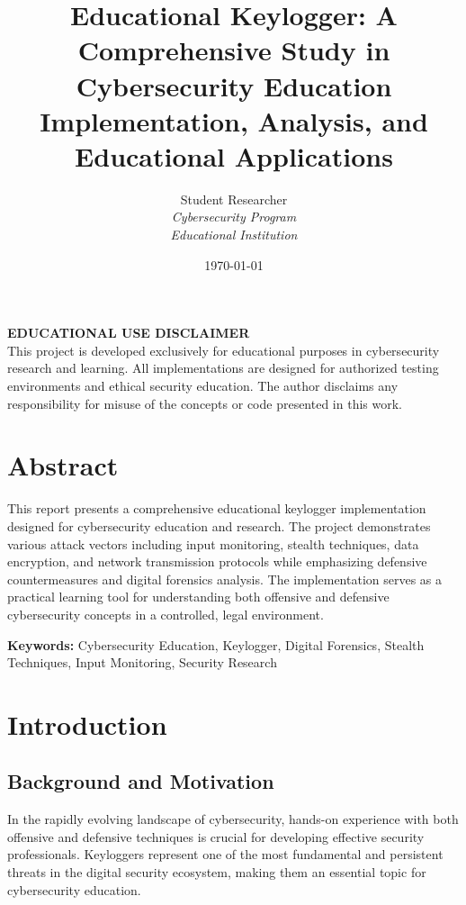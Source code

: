 \documentclass[12pt,a4paper]{article}
\title{\textbf{Educational Keylogger: A Comprehensive Study in Cybersecurity Education}\\
\large{Implementation, Analysis, and Educational Applications}}
\author{Student Researcher\\
\textit{Cybersecurity Program}\\
\textit{Educational Institution}}
\date{\today}
\begin{document}
\maketitle
\thispagestyle{empty}

\vfill
\begin{center}
\textbf{EDUCATIONAL USE DISCLAIMER}\\
\vspace{0.5cm}
This project is developed exclusively for educational purposes in cybersecurity research and learning. All implementations are designed for authorized testing environments and ethical security education. The author disclaims any responsibility for misuse of the concepts or code presented in this work.
\end{center}
\newpage

\tableofcontents
\newpage

\section{Abstract}

This report presents a comprehensive educational keylogger implementation designed for cybersecurity education and research. The project demonstrates various attack vectors including input monitoring, stealth techniques, data encryption, and network transmission protocols while emphasizing defensive countermeasures and digital forensics analysis. The implementation serves as a practical learning tool for understanding both offensive and defensive cybersecurity concepts in a controlled, legal environment.

\textbf{Keywords:} Cybersecurity Education, Keylogger, Digital Forensics, Stealth Techniques, Input Monitoring, Security Research

\section{Introduction}

\subsection{Background and Motivation}

In the rapidly evolving landscape of cybersecurity, hands-on experience with both offensive and defensive techniques is crucial for developing effective security professionals. Keyloggers represent one of the most fundamental and persistent threats in the digital security ecosystem, making them an essential topic for cybersecurity education.
\end{document}
